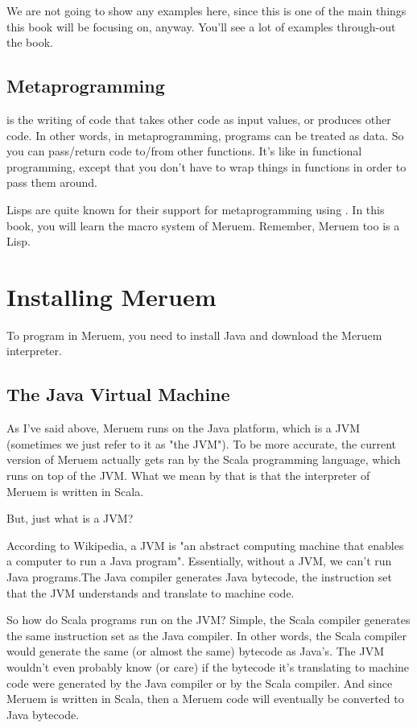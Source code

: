 We are not going to show any examples here, since this is one of the main things this book will be focusing on, anyway. You'll see a lot of examples through-out the book.

\subsection{Metaprogramming}
 is the writing of code that takes other code as input values, or produces other code. In other words, in metaprogramming, programs can be treated as data. So you can pass/return code to/from other functions. It's like in functional programming, except that you don't have to wrap things in functions in order to pass them around. 

Lisps are quite known for their support for metaprogramming using . In this book, you will learn the macro system of Meruem. Remember, Meruem too is a Lisp.  

\section{Installing Meruem}
To program in Meruem, you need to install Java and download the Meruem interpreter.

\subsection{The Java Virtual Machine}
As I've said above, Meruem runs on the Java platform, which is a JVM (sometimes we just refer to it as "the JVM"). To be more accurate, the current version of Meruem actually gets ran by the Scala programming language, which runs on top of the JVM. What we mean by that is that the interpreter of Meruem is written in Scala. 

But, just what is a JVM? 

According to Wikipedia, a JVM is "an abstract computing machine that enables a computer to run a Java program". Essentially, without a JVM, we can't run Java programs.The Java compiler generates Java bytecode, the instruction set that the JVM understands and translate to machine code.

So how do Scala programs run on the JVM? Simple, the Scala compiler generates the same instruction set as the Java compiler. In other words, the Scala compiler would generate the same (or almost the same) bytecode as Java's. The JVM wouldn't even probably know (or care) if the bytecode it's translating to machine code were generated by the Java compiler or by the Scala compiler. And since Meruem is written in Scala, then a Meruem code will eventually be converted to Java bytecode. 

